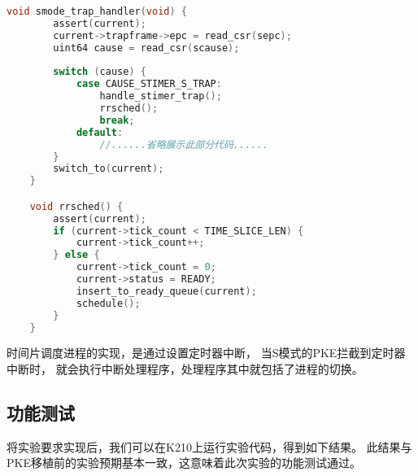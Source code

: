 \begin{lstlisting}[caption={时间片调度}, label={lst:time_slice}, language=C]
    void smode_trap_handler(void) {
        assert(current);
        current->trapframe->epc = read_csr(sepc);
        uint64 cause = read_csr(scause);
    
        switch (cause) {
            case CAUSE_STIMER_S_TRAP:
                handle_stimer_trap();
                rrsched();
                break;
            default:
                //......省略展示此部分代码......
        }
        switch_to(current);
    }

    void rrsched() {
        assert(current);
        if (current->tick_count < TIME_SLICE_LEN) {
            current->tick_count++;
        } else {
            current->tick_count = 0;
            current->status = READY;
            insert_to_ready_queue(current);
            schedule();
        }
    }    
\end{lstlisting}

时间片调度进程的实现，是通过设置定时器中断，
当S模式的PKE拦截到定时器中断时，
就会执行中断处理程序，处理程序其中就包括了进程的切换。

\subsection{功能测试}

将实验要求实现后，我们可以在K210上运行实验代码，得到如下结果。
此结果与PKE移植前的实验预期基本一致，这意味着此次实验的功能测试通过。

